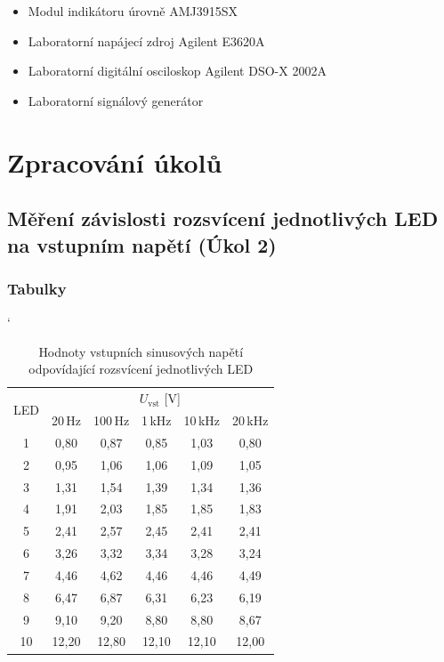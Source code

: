 \documentclass[a4paper, czech]{article}
\begin{document}
\begin{itemize}
    \item Modul indikátoru úrovně AMJ3915SX
    \item Laboratorní napájecí zdroj Agilent E3620A
    \item Laboratorní digitální osciloskop Agilent DSO-X 2002A
    \item Laboratorní signálový generátor
\end{itemize}

\section{Zpracování úkolů}

\subsection{Měření závislosti rozsvícení jednotlivých LED na vstupním napětí (Úkol 2)}

\subsubsection{Tabulky}

\begin{table}[H]
    \catcode`
    \centering
    \caption{Hodnoty vstupních sinusových napětí odpovídající rozsvícení jednotlivých LED}
    \begin{tabular}{cccccc}
        \toprule
        \multirow{2}{*}{LED} & \multicolumn{5}{c}{$U_{\text{vst}}$ [V]} \\
        \cmidrule(rl){2-6}
            & 20\,Hz    & 100\,Hz   & 1\,kHz  & 10\,kHz & 20\,kHz \\
        \midrule
        1   & 0,80  & 0,87  & 0,85  & 1,03  & 0,80  \\
        2   & 0,95  & 1,06  & 1,06  & 1,09  & 1,05  \\
        3   & 1,31  & 1,54  & 1,39  & 1,34  & 1,36  \\
        4   & 1,91  & 2,03  & 1,85  & 1,85  & 1,83  \\
        5   & 2,41  & 2,57  & 2,45  & 2,41  & 2,41  \\
        6   & 3,26  & 3,32  & 3,34  & 3,28  & 3,24  \\
        7   & 4,46  & 4,62  & 4,46  & 4,46  & 4,49  \\
        8   & 6,47  & 6,87  & 6,31  & 6,23  & 6,19  \\
        9   & 9,10  & 9,20  & 8,80  & 8,80  & 8,67  \\
        10  & 12,20 & 12,80 & 12,10 & 12,10 & 12,00 \\
        \bottomrule
    \end{tabular}
\end{table}
\end{document}
